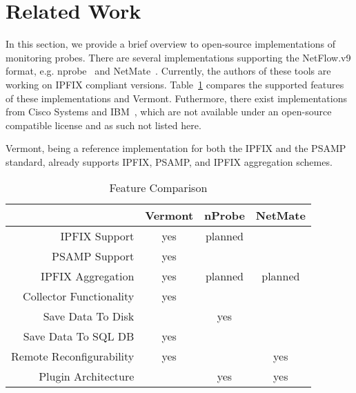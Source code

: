 \section{Related Work}
\label{sec:related-work}


In this section, we provide a brief overview to open-source implementations of monitoring probes.
There are several implementations supporting the NetFlow.v9 format, e.g. nprobe~\cite{deri2003nprobe} and NetMate~\cite{schmoll2004netmate}. Currently, the authors of these tools are working on IPFIX compliant versions.
Table~\ref{tab:features} compares the supported features of these implementations and Vermont.
Futhermore, there exist implementations from Cisco Systems and IBM~\cite{ibm-ipfix}, which are not available under an open-source compatible license and as such not listed here.

Vermont, being a reference implementation for both the IPFIX and the PSAMP standard, already supports IPFIX, PSAMP, and IPFIX aggregation schemes.

\begin{table}
\renewcommand{\arraystretch}{1.0}
\caption{Feature Comparison}
\label{tab:features}
\begin{center}
\begin{tabular}{r|c|c|c}
 & Vermont & nProbe & NetMate\\
\hline
IPFIX Support & yes & planned & \\
PSAMP Support & yes &  & \\
IPFIX Aggregation & yes & planned & planned\\
Collector Functionality & yes &  & \\
Save Data To Disk &  & yes & \\
Save Data To SQL DB & yes & & \\
Remote Reconfigurability & yes &  & yes\\
Plugin Architecture &  & yes & yes\\
\hline
\end{tabular}
\end{center}
\end{table}

